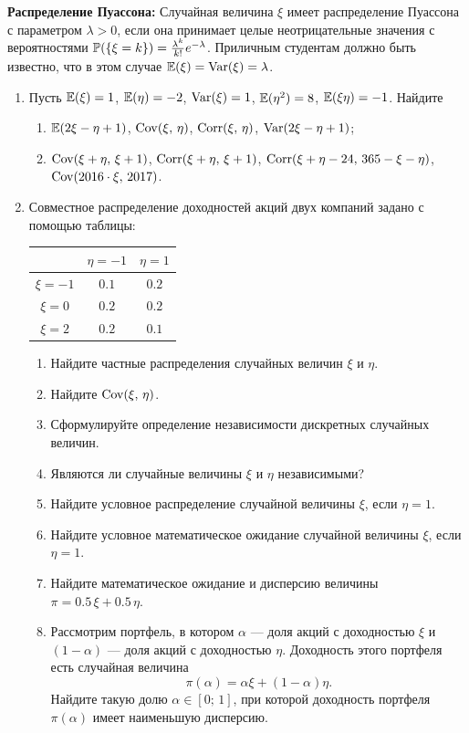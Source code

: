 \textbf{Распределение Пуассона:} Случайная величина $\xi$ имеет распределение Пуассона
с параметром $\lambda > 0$,  если она принимает целые неотрицательные значения с
вероятностями $\P(\{\xi = k\}) = \frac{\lambda^k}{k!}e^{-\lambda}$. Приличным
студентам должно быть известно, что в этом случае $\E(\xi) = \Var(\xi) = \lambda$.

\begin{enumerate}
\item Пусть $\E(\xi) = 1$, $\E(\eta) = -2$, $\Var(\xi) = 1$, $\E(\eta^2) = 8$, $\E(\xi \eta) = -1$. Найдите
\begin{enumerate}
\item $\E(2\xi-\eta+1)$, $\Cov(\xi, \,\eta)$, $\Corr(\xi, \,\eta)$,  $\Var(2\xi-\eta+1)$;
\item $\Cov(\xi+\eta, \,\xi+1)$, $\Corr(\xi+\eta, \,\xi+1)$, $\Corr(\xi+\eta-24, \,365 - \xi - \eta)$, $\Cov(2016\cdot\xi, \, 2017)$.
\end{enumerate}

\item
Совместное распределение доходностей акций двух компаний задано с помощью таблицы:

\begin{center}
\begin{tabular}{ccc}
\toprule
         & $\eta=-1$ & $\eta=1$ \\ \midrule
$\xi=-1$  & $0.1$       & $0.2$ \\
$\xi=0$   & $0.2$       & $0.2$ \\
$\xi=2$   & $0.2$       & $0.1$ \\
\bottomrule
\end{tabular}
\end{center}

\begin{enumerate}
  \item Найдите частные распределения случайных величин $\xi$ и $\eta$.
  \item Найдите $\Cov(\xi,\,\eta)$.
  \item Сформулируйте определение независимости дискретных случайных величин.
  \item Являются ли случайные величины $\xi$ и $\eta$ независимыми?
  \item Найдите условное распределение случайной величины $\xi$, если $\eta = 1$.
  \item Найдите условное математическое ожидание случайной величины $\xi$, если $\eta = 1$.
  \item Найдите математическое ожидание и дисперсию величины $\pi = 0.5\, \xi + 0.5\, \eta$.
  \item Рассмотрим портфель, в котором $\alpha$ — доля акций с доходностью $\xi$
  и $(1 - \alpha)$ — доля акций с доходностью $\eta$. Доходность этого портфеля
  есть случайная величина
  \[
  \pi(\alpha) = \alpha \xi + (1-\alpha)\eta.
  \]
  Найдите такую долю $\alpha \in [0;\,1]$, при которой доходность портфеля $\pi(\alpha)$
  имеет наименьшую дисперсию.
\end{enumerate}


\end{enumerate}
